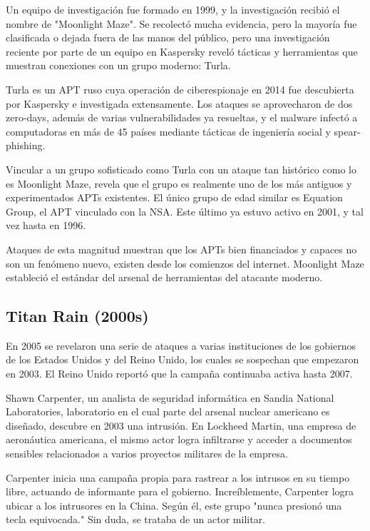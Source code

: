 \documentclass{article}
\begin{document}
Un equipo de investigación fue formado en 1999, y la investigación recibió el nombre de "Moonlight Maze". Se recolectó mucha evidencia, pero la mayoría fue clasificada o dejada fuera de las manos del público, pero una investigación reciente por parte de un equipo en Kaspersky reveló tácticas y herramientas que muestran conexiones con un grupo moderno: Turla.

Turla es un APT ruso cuya operación de ciberespionaje en 2014 fue descubierta por Kaspersky e investigada extensamente. Los ataques se aprovecharon de dos zero-days, además de varias vulnerabilidades ya resueltas, y el malware infectó a computadoras en más de 45 países mediante tácticas de ingeniería social y spear-phishing. \autocite{securelist-turla}

Vincular a un grupo sofisticado como Turla con un ataque tan histórico como lo es Moonlight Maze, revela que el grupo es realmente uno de los más antiguos y experimentados APTs existentes. El único grupo de edad similar es Equation Group, el APT vinculado con la NSA. Este último ya estuvo activo en 2001, y tal vez hasta en 1996. \autocite{securelist-equation}

Ataques de esta magnitud muestran que los APTs bien financiados y capaces no son un fenómeno nuevo, existen desde los comienzos del internet. Moonlight Maze estableció el estándar del arsenal de herramientas del atacante moderno. 

\subsection{Titan Rain (2000s)}
En 2005 se revelaron una serie de ataques a varias instituciones de los gobiernos de los Estados Unidos y del Reino Unido, los cuales se sospechan que empezaron en 2003. El Reino Unido reportó que la campaña continuaba activa hasta 2007. \autocite{cfr-titan-rain}

Shawn Carpenter, un analista de seguridad informática en Sandia National Laboratories, laboratorio en el cual parte del arsenal nuclear americano es diseñado, descubre en 2003 una intrusión. En Lockheed Martin, una empresa de aeronáutica americana, el mismo actor logra infiltrarse y acceder a documentos sensibles relacionados a varios proyectos militares de la empresa.

Carpenter inicia una campaña propia para rastrear a los intrusos en su tiempo libre, actuando de informante para el gobierno. Increíblemente, Carpenter logra ubicar a los intrusores en la China. Según él, este grupo "nunca presionó una tecla equivocada." Sin duda, se trataba de un actor militar.\autocite{time-titan-rain} \autocite{homelandsecurity-titan-rain}
\end{document}
